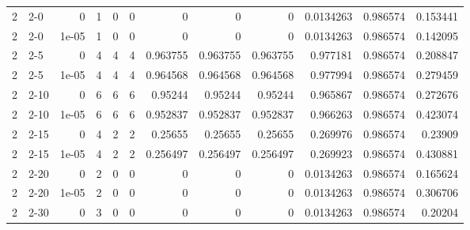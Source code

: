 \begin{tabular}{rlrrrrrrrrrr}
     2 & 2-0    &      0     &           1 &                 0 &                 0 &     0           &     0           &      0           &        0.0134263 &               0.986574 &           0.153441 \\
     2 & 2-0    &      1e-05 &           1 &                 0 &                 0 &     0           &     0           &      0           &        0.0134263 &               0.986574 &           0.142095 \\
     2 & 2-5    &      0     &           4 &                 4 &                 4 &     0.963755    &     0.963755    &      0.963755    &        0.977181  &               0.986574 &           0.208847 \\
     2 & 2-5    &      1e-05 &           4 &                 4 &                 4 &     0.964568    &     0.964568    &      0.964568    &        0.977994  &               0.986574 &           0.279459 \\
     2 & 2-10   &      0     &           6 &                 6 &                 6 &     0.95244     &     0.95244     &      0.95244     &        0.965867  &               0.986574 &           0.272676 \\
     2 & 2-10   &      1e-05 &           6 &                 6 &                 6 &     0.952837    &     0.952837    &      0.952837    &        0.966263  &               0.986574 &           0.423074 \\
     2 & 2-15   &      0     &           4 &                 2 &                 2 &     0.25655     &     0.25655     &      0.25655     &        0.269976  &               0.986574 &           0.23909  \\
     2 & 2-15   &      1e-05 &           4 &                 2 &                 2 &     0.256497    &     0.256497    &      0.256497    &        0.269923  &               0.986574 &           0.430881 \\
     2 & 2-20   &      0     &           2 &                 0 &                 0 &     0           &     0           &      0           &        0.0134263 &               0.986574 &           0.165624 \\
     2 & 2-20   &      1e-05 &           2 &                 0 &                 0 &     0           &     0           &      0           &        0.0134263 &               0.986574 &           0.306706 \\
     2 & 2-30   &      0     &           3 &                 0 &                 0 &     0           &     0           &      0           &        0.0134263 &               0.986574 &           0.20204  \\

\end{tabular}
